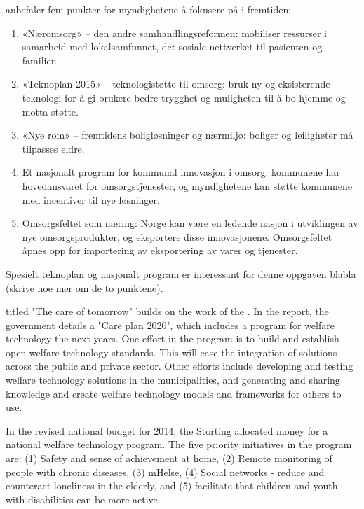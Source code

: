 \citet{regjeringen_hagen} anbefaler fem punkter for myndighetene å fokusere på i fremtiden:

\begin{enumerate}
    \item «Næromsorg» -- den andre samhandlingsreformen: mobiliser ressurser i samarbeid med
    lokalsamfunnet, det sosiale nettverket til pasienten og familien.
    \item «Teknoplan 2015» -- teknologistøtte til omsorg: bruk ny og eksisterende teknologi for å gi brukere
    bedre trygghet og muligheten til å bo hjemme og motta støtte.
    \item «Nye rom» -- fremtidens boligløsninger og nærmiljø: boliger og leiligheter må tilpasses eldre.
    \item Et nasjonalt program for kommunal innovasjon i omsorg: kommunene har hovedansvaret for omsorgstjenester,
    og myndighetene kan støtte kommunene med incentiver til nye løsninger.
    \item Omsorgsfeltet som næring: Norge kan være en ledende nasjon i utviklingen av nye omsorgsprodukter, og
    eksportere disse innovasjonene. Omsorgsfeltet åpnes opp for importering av eksportering av varer og tjenester.
\end{enumerate}

Spesielt teknoplan og nasjonalt program er interessant for denne oppgaven blabla (skrive noe mer om de to punktene).

\citet{morgendagens_omsorg} titled "The care of tomorrow" builds on the work of the \citet{regjeringen_hagen}
.
In the report, the government details a "Care plan 2020", which includes a program for welfare technology the next years.
One effort in the program is to build and establish open welfare technology standards. This will ease the integration of solutions
across the public and private sector. Other efforts include developing and testing welfare technology solutions in the municipalities,
and generating and sharing knowledge and create welfare technology models and frameworks for others to use.

In the revised national budget for 2014, the Storting allocated money for a national welfare technology program. The
five priority initiatives in the program are: (1) Safety and sense of achievement at home, (2) Remote monitoring of
people with chronic diseases, (3) mHelse, (4) Social networks - reduce and counteract loneliness in the elderly, and (5)
facilitate that children and youth with disabilities can be more active.

